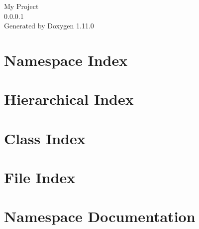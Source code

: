 \documentclass[twoside]{book}
\newcommand{\+}{\discretionary{\mbox{\scriptsize$\hookleftarrow$}}{}{}}
\newcommand{\clearemptydoublepage}{%
    \newpage{\pagestyle{empty}\cleardoublepage}%
  }
\begin{document}
  \raggedbottom
    \hypersetup{pageanchor=false,
                bookmarksnumbered=true,
                pdfencoding=unicode
               }
  \begin{titlepage}
  \vspace*{7cm}
  \begin{center}%
  {\Large My Project}\\
  [1ex]\large 0.\+0.\+0.\+1 \\
  \vspace*{1cm}
  {\large Generated by Doxygen 1.11.0}\\
  \end{center}
  \end{titlepage}
  \clearemptydoublepage
  \tableofcontents
  \clearemptydoublepage
  \hypersetup{pageanchor=true}
\chapter{Namespace Index}

\chapter{Hierarchical Index}

\chapter{Class Index}

\chapter{File Index}

\chapter{Namespace Documentation}











\end{document}
